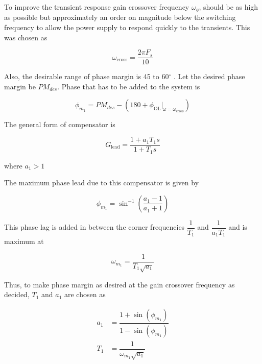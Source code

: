 \documentclass[a4paper]{IEEEtran}
\begin{document}
	To improve the transient response gain crossover frequency $\omega_{gc}$ should be as high as possible but approximately an order on magnitude below the switching frequency to allow the power supply to respond quickly to the transients. This was chosen as

	\begin{equation}
		\omega_{\text{cross}} = \dfrac{2 \pi F_s}{10}
		\label{eq:50}
	\end{equation}

    Also, the desirable range of phase margin is 45 to 60$^\circ$ \cite{book:768263}. Let the desired phase margin be $PM_{des}$.
    Phase that has to be added to the system is 

    \begin{equation}
    \phi_{m_1} = PM_{des} -\left(180 + \phi_{\text{OL}}\Bigr|_{\omega = \omega_{\text{cross}}}\right)
	\label{eq:50a}    
    \end{equation}

    The general form of compensator is 

    \begin{equation}
    	G_{\text{lead}} = \dfrac{1+a_1T_1s}{1+T_1s}
	    \label{eq:51}    
    \end{equation}

    where $a_1>1$

    The maximum phase lead due to this compensator is given by

    \begin{equation}
    	\phi_{m_1} = \sin^{-1}\left(\dfrac{a_1-1}{a_1+1}\right)
	    \label{eq:52}    
    \end{equation}

    This phase lag is added in between the corner frequencies $\dfrac{1}{T_1}$ and $\dfrac{1}{a_1T_1}$ and is maximum at

    \begin{equation}
    	\omega_{m_1} = \dfrac{1}{T_1\sqrt{a_1}}
	    \label{eq:53}    
    \end{equation}

    Thus, to make phase margin as desired at the gain crossover frequency as decided, $T_1$ and $a_1$ are chosen as

    \begin{equation}
		\begin{split}
			a_1 &= \dfrac{1+\sin(\phi_{m_1})}{1-\sin(\phi_{m_1})}\\
			T_1 &= \dfrac{1}{\omega_{m_1}\sqrt{a_1}}		
		\end{split}
		\label{eq:54}    
    \end{equation}
\end{document}
